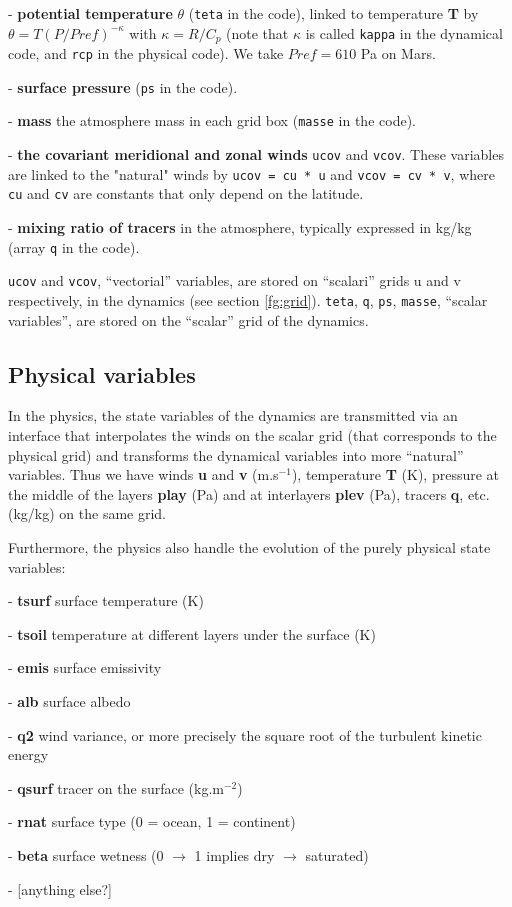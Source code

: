 \begin{description}
\item - {\bf potential temperature} $\theta$ ({\tt teta} in the code),
linked to temperature {\bf T} by $\theta = T{(P/Pref)}^{-\kappa}$
with $\kappa = R/C_p$
(note that $\kappa$ is called {\tt kappa} in the dynamical code, and {\tt rcp}
in the physical code). We take $Pref=610$ Pa on  Mars.
\item - {\bf surface pressure} ({\tt ps} in the code).
\item - {\bf mass} the atmosphere mass in each grid box ({\tt masse}
in the code).
\item - {\bf the covariant meridional and zonal winds}
{\tt ucov} and {\tt vcov}.
These variables are linked to the "natural" winds by
\verb+ucov = cu * u+ and \verb+vcov = cv * v+, where
\verb+cu+ and \verb+cv+ are constants that only depend on the latitude.
\item - {\bf mixing ratio of tracers} in the atmosphere, typically
expressed in kg/kg (array {\tt q} in the code).
\end{description}

{\tt ucov} and {\tt vcov}, ``vectorial'' variables, are stored on
``scalari'' grids u and v respectively, in the dynamics
(see section \ref{fg:grid}).
{\tt teta}, {\tt q}, {\tt ps}, {\tt masse}, ``scalar variables'',
are stored on the ``scalar'' grid of the dynamics.



\subsection{Physical variables}

In the physics, the state variables of the dynamics are transmitted
via an interface that interpolates the winds on the scalar grid
(that corresponds to the physical grid) and transforms the dynamical variables
into more ``natural'' variables.
Thus we have winds {\bf u} and  {\bf v} (m.s$^{-1}$),
temperature {\bf T} (K), pressure at the middle of the layers
{\bf play} (Pa) and at interlayers {\bf plev} (Pa), tracers
{\bf q}, etc. (kg/kg) on the same grid.

Furthermore, the physics also handle the evolution of the purely
physical state variables:
\begin{description}
\item - {\bf tsurf} surface temperature (K)
\item - {\bf tsoil} temperature at different layers under the surface (K)
\item - {\bf emis} surface emissivity
\item - {\bf alb} surface albedo
\item - {\bf q2} wind variance, or more precisely the square root of
the turbulent kinetic energy
\item - {\bf qsurf} tracer on the surface (kg.m$^{-2}$)
\item - {\bf rnat} surface type (0 = ocean, 1 = continent)
\item - {\bf beta} surface wetness (0 $\to$ 1 implies dry $\to$ saturated)
\item - [anything else?]
\end{description}

